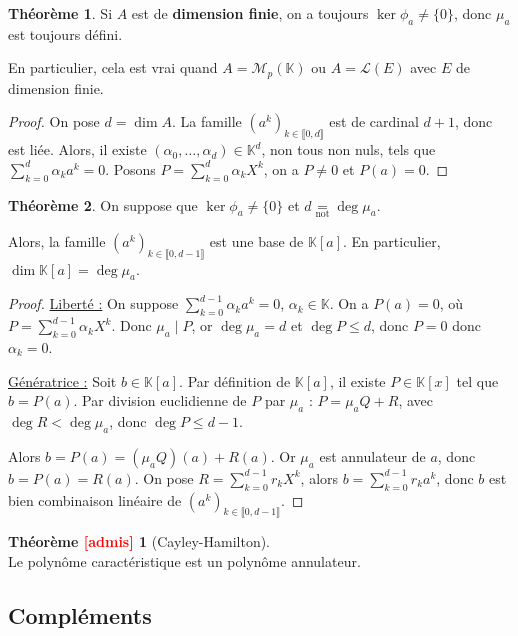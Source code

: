 \documentclass[12pt]{book}
\let\ensembleNombre\mathbb
\newcommand*\K{\ensuremath{\ensembleNombre{K}}}
\theoremstyle{definition}
\newtheorem{thme}{Théorème}[chapter]
\newtheorem*{thmead}{Théorème \textcolor{red}{[admis]}}
\theoremstyle{remark}
\newenvironment{fthme}
  {\begin{mdframed}[roundcorner=10pt, linewidth=2pt]\begin{thme}}
  {\end{thme}\end{mdframed}}
\newenvironment{fthmead}
  {\begin{mdframed}[roundcorner=10pt, linewidth=2pt]\begin{thmead}}
  {\end{thmead}\end{mdframed}}
\begin{document}
	\begin{fthme}
	Si $A$ est de \textbf{dimension finie}, on a toujours $\ker \phi_a \neq \lbrace 0 \rbrace$, donc $\mu_a$ est toujours défini.
	
	En particulier, cela est vrai quand $A = \mathcal M_p(\K)$ ou $A = \mathcal L(E)$ avec $E$ de dimension finie.
	\end{fthme}
	\begin{proof}
	On pose $d = \dim A$. La famille $(a^k)_{k\in \llbracket 0, d \rrbracket}$ est de cardinal $d+1$, donc est liée. Alors, il existe $(\alpha_0, \ldots, \alpha_d) \in \K^d$, non tous non nuls, tels que $\sum_{k=0}^d \alpha_k a^k = 0$. Posons $P = \sum_{k=0}^d \alpha_k X^k$, on a $P \neq 0$ et $P(a) = 0$.
	\end{proof}
	
	\begin{fthme}
	On suppose que $\ker \phi_a \neq \lbrace 0 \rbrace$ et $d \underset{\mathrm{not}}{=} \deg \mu_a$. 
	
	Alors, la famille $(a^k)_{k\in \llbracket 0, d-1 \rrbracket}$ est une base de $\K[a]$. En particulier, $\dim \K[a] = \deg \mu_a$.
	\end{fthme}
	\begin{proof}
	\underline{Liberté :} On suppose $\sum_{k=0}^{d-1} \alpha_k a^k = 0$, $\alpha_k \in \K$. On a $P(a) = 0$, où $P = \sum_{k=0}^{d-1} \alpha_k X^k$. Donc $\mu_a \;|\; P$, or $\deg \mu_a = d$ et $\deg P \leq d$, donc $P = 0$ donc $\alpha_k = 0$.
	
	\underline{Génératrice :} Soit $b \in \K[a]$. Par définition de $\K[a]$, il existe $P \in \K[x]$ tel que $b = P(a)$. Par division euclidienne de $P$ par $\mu_a$ : $P =\mu_a Q + R$, avec $\deg R < \deg \mu_a$, donc $\deg P \leq d-1$.
	
	Alors $b = P(a) = (\mu_a Q)(a) + R(a)$. Or $\mu_a$ est annulateur de $a$, donc $b = P(a) = R(a)$. On pose $R = \sum_{k=0}^{d-1} r_k X^k$, alors $b = \sum_{k=0}^{d-1} r_k a^k$, donc $b$ est bien combinaison linéaire de $(a^k)_{k \in \llbracket 0, d-1 \rrbracket}$.
	\end{proof}
	
	\begin{fthmead}[Cayley-Hamilton] \mbox{~}\\
	Le polynôme caractéristique est un polynôme annulateur.
	\end{fthmead} \newpage
	
	\subsection{Compléments}
\end{document}
